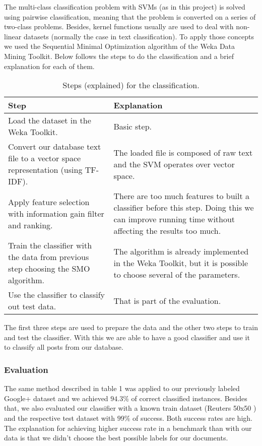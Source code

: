 The multi-class classification problem with SVMs (as in this project) is solved using pairwise classification, meaning that the problem is converted on a series of two-class problems. Besides, kernel functions usually are used to deal with non-linear datasets (normally the case in text classification).
To apply those concepts we used the Sequential Minimal Optimization algorithm of the Weka Data Mining Toolkit. Below follows the steps to do the classification and a brief explanation for each of them.

\begin{table}[ht]
	\label{weka_steps}
	\centering
	\caption{Steps (explained) for the classification.}
    \begin{tabular}{| p{5cm} | p{5cm} |}
    	\hline
		\textbf{Step} & \textbf{Explanation} \\ \hline
		Load the dataset in the Weka Toolkit. & Basic step.  \\ \hline
		Convert our database text file to a vector space representation (using TF-IDF). & The loaded file is composed of raw text and the SVM operates over vector space.   \\ \hline
		Apply feature selection with information gain filter and ranking. & There are too much features to built a classifier before this step. Doing this we can improve running time without affecting the results too much.  \\ \hline
		Train the classifier with the data from previous step choosing the SMO algorithm. & The algorithm is already implemented in the Weka Toolkit, but it is possible to choose several of the parameters. \\ \hline
		Use the classifier to classify out test data. & That is part of the evaluation. \\
	\hline
    \end{tabular}
\end{table}

The first three steps are used to prepare the data and the other two steps to train and test the classifier. With this we are able to have a good classifier and use it to classify all posts from our database.


\subsubsection*{Evaluation}
The same method described in table 1 was applied to our previously labeled Google+ dataset and we achieved $ 94.3\% $ of correct classified instances. Besides that, we also evaluated our classifier with a known train dataset (Reuters 50x50 \cite{reuters50x50}) and the respective test dataset with $ 99\% $ of success. Both success rates are high. The explanation for achieving higher success rate in a benchmark than with our data is that we didn’t choose the best possible labels for our documents.
